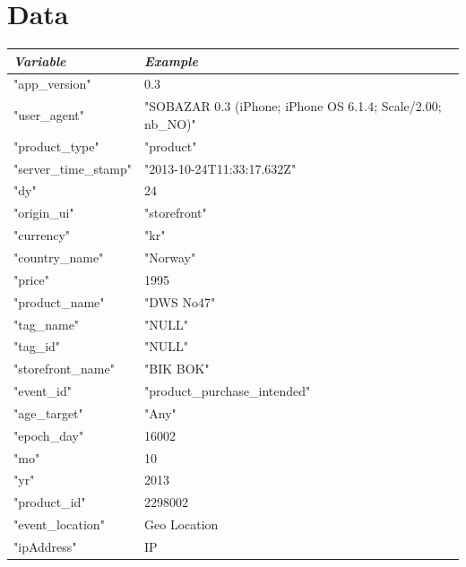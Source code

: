 
\appendix
\clearpage
{}
\setcounter{page}{1}

\chapter{Data}\label{app:req}
    \begin{table}[H]
        \centering
        \begin{tabular}{l|l}
            \toprule
            \emph{Variable}        & \emph{Example}   \\ \hline
            "app\_version"   &   0.3  \\ \hline
            "user\_agent"    &   "SOBAZAR 0.3 (iPhone; iPhone OS 6.1.4; Scale/2.00; nb\_NO)"   \\ \hline
            "product\_type"  &   "product"    \\ \hline
            "server\_time\_stamp" &   "2013-10-24T11:33:17.632Z"   \\ \hline
            "dy"    &   24   \\ \hline
            "origin\_ui" &   "storefront"     \\ \hline
            "currency"  &   "kr"     \\ \hline
            "country\_name"  &   "Norway"     \\ \hline
            "price" &   1995     \\ \hline
            "product\_name"  &   "DWS No47"   \\ \hline
            "tag\_name"  &   "NULL"   \\ \hline
            "tag\_id"    &   "NULL"   \\ \hline
            "storefront\_name"   &   "BIK BOK"    \\ \hline
            "event\_id"  &   "product\_purchase\_intended"  \\ \hline
            "age\_target"    &   "Any"    \\ \hline
            "epoch\_day" &   16002    \\ \hline
            "mo"    &   10   \\ \hline
            "yr"    &   2013     \\ \hline
            "product\_id"    &   2298002  \\ \hline
            "event\_location"    &   Geo Location     \\ \hline
            "ipAddress" &   IP  \\ \hline

\end{tabular}
\end{table}

